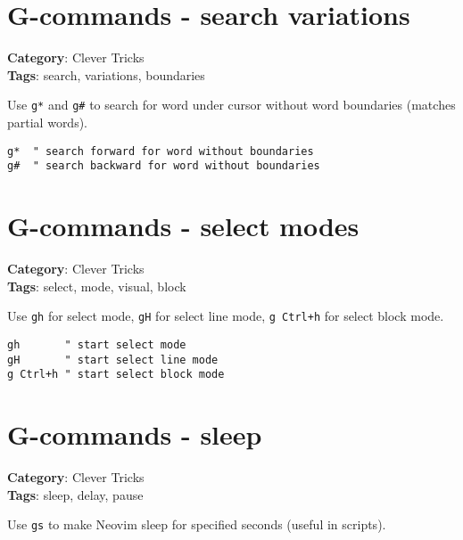{{{\section{G-commands - search variations}

\textbf{Category}: Clever Tricks\\ \textbf{Tags}: search, variations, boundaries
\vspace{0.5cm}

Use {\footnotesize \Verb§g*§} and {\footnotesize \Verb§g#§} to search for word under cursor without word boundaries (matches partial words).

\begin{Exa*}{}
\begin{Verbatim}[fontsize=\footnotesize, breaklines, breakanywhere]
g*  " search forward for word without boundaries
g#  " search backward for word without boundaries
\end{Verbatim}
\end{Exa*}

\section{G-commands - select modes}

\textbf{Category}: Clever Tricks\\ \textbf{Tags}: select, mode, visual, block
\vspace{0.5cm}

Use {\footnotesize \Verb§gh§} for select mode, {\footnotesize \Verb§gH§} for select line mode, {\footnotesize \Verb§g Ctrl+h§} for select block mode.

\begin{Exa*}{}
\begin{Verbatim}[fontsize=\footnotesize, breaklines, breakanywhere]
gh       " start select mode
gH       " start select line mode
g Ctrl+h " start select block mode
\end{Verbatim}
\end{Exa*}

\section{G-commands - sleep}

\textbf{Category}: Clever Tricks\\ \textbf{Tags}: sleep, delay, pause
\vspace{0.5cm}

Use {\footnotesize \Verb§gs§} to make Neovim sleep for specified seconds (useful in scripts).

}}}
